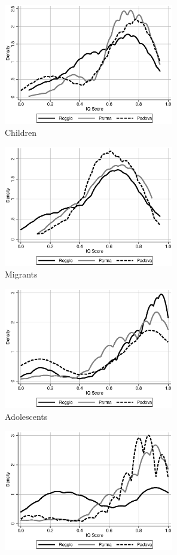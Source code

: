 \begin{figure}[H]
	\begin{center}
	\caption{Densities of IQ Scores}\label{fig:iq-hist}
	\begin{subfigure}{.5\textwidth}
		\centering
		\includegraphics[width=20em]{../../../../Output/IQ_score_1}
		\caption{Children}
	\end{subfigure}%
	\begin{subfigure}{.5\textwidth}
		\centering
		\includegraphics[width=20em]{../../../../Output/IQ_score_2}
		\caption{Migrants}
	\end{subfigure}
	\begin{subfigure}{.5\textwidth}
		\centering
		\includegraphics[width=20em]{../../../../Output/IQ_score_3}
		\caption{Adolescents}
	\end{subfigure}%
	\begin{subfigure}{.5\textwidth}
		\centering
		\includegraphics[width=20em]{../../../../Output/IQ_score_4}

\end{subfigure}
\end{center}
\end{figure}
